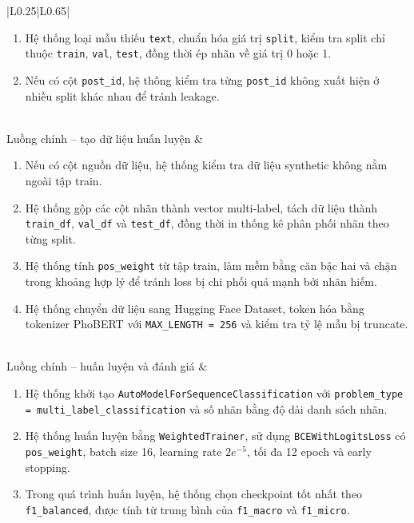 \begin{longtable}{|L{0.25\textwidth}|L{0.65\textwidth}|}
\begin{minipage}[t]{\linewidth}
\begin{enumerate}[label=\textbf{Bước \arabic*:}, leftmargin=1.55cm, itemsep=0pt, topsep=0pt]
    \item Hệ thống loại mẫu thiếu \texttt{text}, chuẩn hóa giá trị \texttt{split}, kiểm tra split chỉ thuộc \texttt{train}, \texttt{val}, \texttt{test}, đồng thời ép nhãn về giá trị 0 hoặc 1.
    \item Nếu có cột \texttt{post\_id}, hệ thống kiểm tra từng \texttt{post\_id} không xuất hiện ở nhiều split khác nhau để tránh leakage.
\end{enumerate}
\end{minipage} \\ \hline
Luồng chính -- tạo dữ liệu huấn luyện &
\begin{minipage}[t]{\linewidth}
\begin{enumerate}[label=\textbf{Bước \arabic*:}, leftmargin=1.55cm, itemsep=0pt, topsep=0pt]
    \item Nếu có cột nguồn dữ liệu, hệ thống kiểm tra dữ liệu synthetic không nằm ngoài tập train.
    \item Hệ thống gộp các cột nhãn thành vector multi-label, tách dữ liệu thành \texttt{train\_df}, \texttt{val\_df} và \texttt{test\_df}, đồng thời in thống kê phân phối nhãn theo từng split.
    \item Hệ thống tính \texttt{pos\_weight} từ tập train, làm mềm bằng căn bậc hai và chặn trong khoảng hợp lý để tránh loss bị chi phối quá mạnh bởi nhãn hiếm.
    \item Hệ thống chuyển dữ liệu sang Hugging Face Dataset, token hóa bằng tokenizer PhoBERT với \texttt{MAX\_LENGTH = 256} và kiểm tra tỷ lệ mẫu bị truncate.
\end{enumerate}
\end{minipage} \\ \hline
Luồng chính -- huấn luyện và đánh giá &
\begin{minipage}[t]{\linewidth}
\begin{enumerate}[label=\textbf{Bước \arabic*:}, leftmargin=1.55cm, itemsep=0pt, topsep=0pt]
    \item Hệ thống khởi tạo \texttt{AutoModelForSequenceClassification} với \texttt{problem\_type = multi\_label\_classification} và số nhãn bằng độ dài danh sách nhãn.
    \item Hệ thống huấn luyện bằng \texttt{WeightedTrainer}, sử dụng \texttt{BCEWithLogitsLoss} có \texttt{pos\_weight}, batch size 16, learning rate \(2e^{-5}\), tối đa 12 epoch và early stopping.
    \item Trong quá trình huấn luyện, hệ thống chọn checkpoint tốt nhất theo \texttt{f1\_balanced}, được tính từ trung bình của \texttt{f1\_macro} và \texttt{f1\_micro}.

\end{enumerate}
\end{minipage}
\end{longtable}
